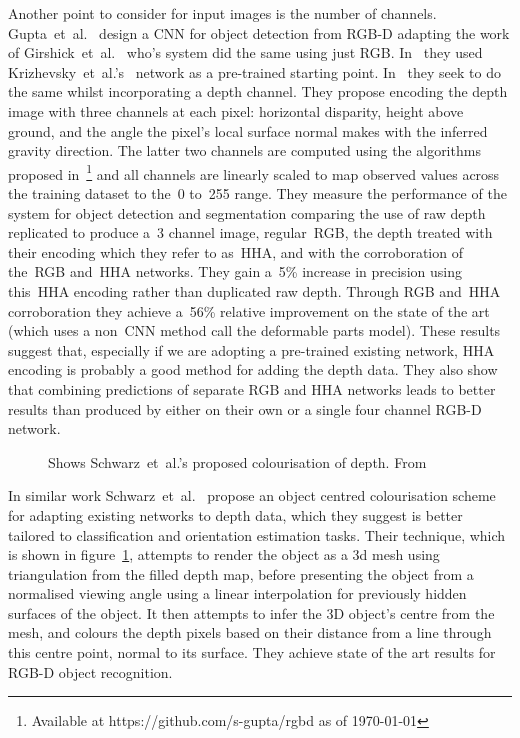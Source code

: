\documentclass[11pt]{article} %
\begin{document}
Another point to consider for input images is the number of channels. Gupta~et~al.~\cite{Gupta2014} design a CNN for object detection from RGB-D adapting the work of Girshick~et~al.~\cite{Girshick2014} who's system did the same using just RGB. In~\cite{Girshick2014} they used Krizhevsky~et~al.'s~\cite{Krizhevsky2012} network as a pre-trained starting point. In~\cite{Gupta2014} they seek to do the same whilst incorporating a depth channel. They propose encoding the depth image with three channels at each pixel: horizontal disparity, height above ground, and the angle the pixel’s local surface normal makes with the inferred gravity direction. The latter two channels are computed using the algorithms proposed in~\cite{Gupta2013}\footnote{Available at https://github.com/s-gupta/rgbd as of \today} and all channels are linearly scaled to map observed values across the training dataset to the~0 to~255 range. They measure the performance of the system for object detection and segmentation comparing the use of raw depth replicated to produce a~3 channel image, regular~RGB, the depth treated with their encoding which they refer to as~HHA, and with the corroboration of the~RGB and~HHA networks. They gain a~5\% increase in precision using this~HHA encoding rather than duplicated raw depth. Through RGB and~HHA corroboration they achieve a~56\% relative improvement on the state of the art (which uses a non~CNN method call the deformable parts model). These results suggest that, especially if we are adopting a pre-trained existing network, HHA encoding is probably a good method for adding the depth data. They also show that combining predictions of separate RGB and HHA networks leads to better results than produced by either on their own or a single four channel RGB-D network.
\begin{figure}
\centering
{}%
\qquad
{}%
\caption{Shows Schwarz~et~al.'s proposed colourisation of depth. From~\cite{Schwarz2015}		\label{fig:schwarzDepth} }
\label{fig:schwarz}
\end{figure}

In similar work Schwarz~et~al.~\cite{Schwarz2015} propose an object centred colourisation scheme for adapting existing networks to depth data, which they suggest is better tailored to classification and orientation estimation tasks. Their technique, which is shown in figure~\ref{fig:schwarz}, attempts to render the object as a 3d mesh using triangulation from the filled depth map, before presenting the object from a normalised viewing angle using a linear interpolation for previously hidden surfaces of the object. It then attempts to infer the 3D object's centre from the mesh, and colours the depth pixels based on their distance from a line through this centre point, normal to its surface. They achieve state of the art results for RGB-D object recognition.
\end{document}

